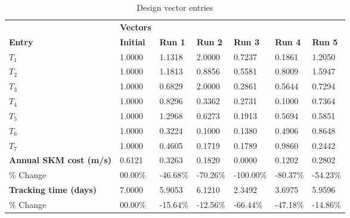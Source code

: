 \begin{table}[H]
\centering
\begin{tabular}{lllllll}
\textbf{} & \cellcolor[HTML]{EFEFEF}\textbf{Vectors} & \textbf{} & \textbf{} & \textbf{} & \textbf{} & \textbf{} \\
\rowcolor[HTML]{EFEFEF} \cellcolor[HTML]{EFEFEF}\textbf{Entry} & \cellcolor[HTML]{EFEFEF}\textbf{Initial} & \cellcolor[HTML]{EFEFEF}\textbf{Run 1} & \cellcolor[HTML]{EFEFEF}\textbf{Run 2} & \cellcolor[HTML]{EFEFEF}\textbf{Run 3} & \cellcolor[HTML]{EFEFEF}\textbf{Run 4} & \cellcolor[HTML]{EFEFEF}\textbf{Run 5} \\
$T_{1}$ & 1.0000 & 1.1318 & 2.0000 & 0.7237 & 0.1861 & 1.2050 \\
$T_{2}$ & 1.0000 & 1.1813 & 0.8856 & 0.5581 & 0.8009 & 1.5947 \\
$T_{3}$ & 1.0000 & 0.6829 & 2.0000 & 0.2861 & 0.5644 & 0.7294 \\
$T_{4}$ & 1.0000 & 0.8296 & 0.3362 & 0.2731 & 0.1000 & 0.7364 \\
$T_{5}$ & 1.0000 & 1.2968 & 0.6273 & 0.1913 & 0.5694 & 0.5851 \\
$T_{6}$ & 1.0000 & 0.3224 & 0.1000 & 0.1380 & 0.4906 & 0.8648 \\
$T_{7}$ & 1.0000 & 0.4605 & 0.1719 & 0.1789 & 0.9860 & 0.2442 \\
\rowcolor[HTML]{EFEFEF} 
\cellcolor[HTML]{EFEFEF}\textbf{Annual SKM cost (m/s)} & \cellcolor[HTML]{EFEFEF}0.6121 & 0.3263 & 0.1820 & 0.0000 & 0.1202 & 0.2802 \\
\% Change & 00.00\% &-46.68\% & -70.26\% & -100.00\% & -80.37\% & -54.23\% \\
\rowcolor[HTML]{EFEFEF} 
\cellcolor[HTML]{EFEFEF}\textbf{Tracking time (days)} & \cellcolor[HTML]{EFEFEF}7.0000 & 5.9053 & 6.1210 & 2.3492 & 3.6975 & 5.9596 \\
\% Change & 00.00\% &-15.64\% & -12.56\% & -66.44\% & -47.18\% & -14.86\% \\
\end{tabular}
\caption{Design vector entries}
\label{tab:DesignVectorEntries}
\end{table}